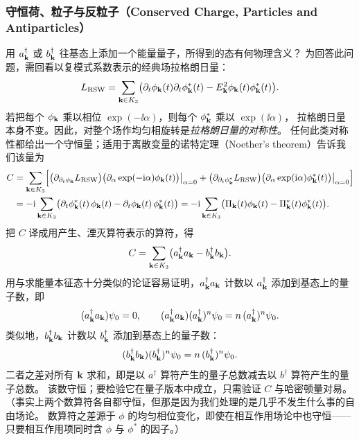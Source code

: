 \subsubsection{守恒荷、粒子与反粒子（Conserved Charge, Particles and Antiparticles）}

用 $a^{\dagger}_{\mathbf{k}}$ 或 $b^{\dagger}_{\mathbf{k}}$ 往基态上添加一个能量量子，所得到的态有何物理含义？
为回答此问题，需回看以复模式系数表示的经典场拉格朗日量：
\begin{equation*}
L_{\text{RSW}}=\sum_{\mathbf{k}\in K_{3}}\bigl(\partial_{t}\phi_{\mathbf{k}}(t)\partial_{t}\phi^{*}_{\mathbf{k}}(t)
-E_{\mathbf{k}}^{2}\phi_{\mathbf{k}}(t)\phi^{*}_{\mathbf{k}}(t)\bigr).
\end{equation*}
若把每个 $\phi_{\mathbf{k}}$ 乘以相位 $\exp(-\ii\alpha)$，则每个 $\phi^{*}_{\mathbf{k}}$ 乘以 $\exp(\ii\alpha)$，
拉格朗日量本身不变。因此，对整个场作均匀相旋转是\emph{拉格朗日量的对称性}。
任何此类对称性都给出一个守恒量；适用于离散变量的诺特定理（Noether's theorem）告诉我们该量为
\begin{align*}
C&=\sum_{\mathbf{k}\in K_{3}}\Bigl[
\bigl(\partial_{\partial_{t}\phi_{\mathbf{k}}}L_{\text{RSW}}\bigr)
\bigl(\partial_{\alpha}\exp(-\mathrm{i}\alpha)\phi_{\mathbf{k}}(t)\bigr)\big|_{\alpha=0}
+\bigl(\partial_{\partial_{t}\phi^{*}_{\mathbf{k}}}L_{\text{RSW}}\bigr)
\bigl(\partial_{\alpha}\exp(\mathrm{i}\alpha)\phi^{*}_{\mathbf{k}}(t)\bigr)\big|_{\alpha=0}\Bigr]\\
&=-\mathrm{i}\sum_{\mathbf{k}\in K_{3}}\bigl(\partial_{t}\phi^{*}_{\mathbf{k}}(t)\,\phi_{\mathbf{k}}(t)
-\partial_{t}\phi_{\mathbf{k}}(t)\,\phi^{*}_{\mathbf{k}}(t)\bigr)
=-\mathrm{i}\sum_{\mathbf{k}\in K_{3}}\bigl(\Pi_{\mathbf{k}}(t)\phi_{\mathbf{k}}(t)-\Pi^{*}_{\mathbf{k}}(t)\phi^{*}_{\mathbf{k}}(t)\bigr).
\end{align*}
把 $C$ 译成用产生、湮灭算符表示的算符，得
\begin{equation*}
C=\sum_{\mathbf{k}\in K_{3}}\bigl(a^{\dagger}_{\mathbf{k}}a_{\mathbf{k}}-b^{\dagger}_{\mathbf{k}}b_{\mathbf{k}}\bigr).
\end{equation*}
用与求能量本征态十分类似的论证容易证明，$a^{\dagger}_{\mathbf{k}}a_{\mathbf{k}}$ 计数以 $a^{\dagger}_{\mathbf{k}}$
添加到基态上的量子数，即
\begin{equation*}
(a^{\dagger}_{\mathbf{k}}a_{\mathbf{k}})\psi_{0}=0,\qquad
(a^{\dagger}_{\mathbf{k}}a_{\mathbf{k}})(a^{\dagger}_{\mathbf{k}})^{n}\psi_{0}=n\,(a^{\dagger}_{\mathbf{k}})^{n}\psi_{0}.
\end{equation*}
类似地，$b^{\dagger}_{\mathbf{k}}b_{\mathbf{k}}$ 计数以 $b^{\dagger}_{\mathbf{k}}$ 添加到基态上的量子数：
\begin{equation*}
(b^{\dagger}_{\mathbf{k}}b_{\mathbf{k}})(b^{\dagger}_{\mathbf{k}})^{n}\psi_{0}=n\,(b^{\dagger}_{\mathbf{k}})^{n}\psi_{0}.
\end{equation*}
二者之差对所有 $\mathbf{k}$ 求和，即是以 $a^{\dagger}$ 算符产生的量子总数减去以 $b^{\dagger}$ 算符产生的量子总数。
该数守恒；要检验它在量子版本中成立，只需验证 $C$ 与哈密顿量对易。
（事实上两个数算符各自都守恒，但那是因为我们处理的是几乎不发生什么事的自由场论。
数算符之差源于 $\phi$ 的均匀相位变化，即使在相互作用场论中也守恒——只要相互作用项同时含
$\phi$ 与 $\phi^{*}$ 的因子。）

